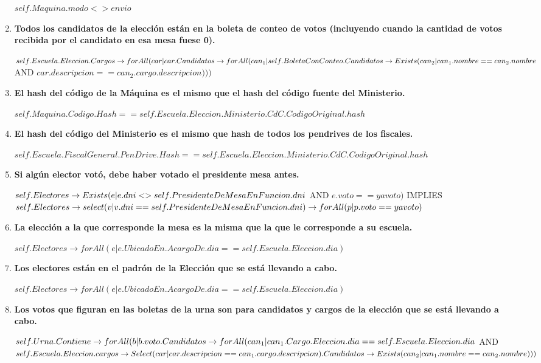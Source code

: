 \begin{enumerate}
$self.Maquina.modo <> envio$

\item \textbf{Todos los candidatos de la elecci\'on est\'an en la boleta de conteo de votos (incluyendo cuando la cantidad de votos recibida por el candidato en esa mesa fuese 0).}

$self.Escuela.Eleccion.Cargos \rightarrow \\
forAll(car | car.Candidatos \rightarrow \\
forAll(can_1 | self.BoletaConConteo.Candidatos \rightarrow \\
Exists(can_2| can_1.nombre == can_2.nombre $ AND $car.descripcion==can_2.cargo.descripcion)))$

\item \textbf{El hash del código de la M\'aquina es el mismo que el hash del código fuente del Ministerio. }

$self.Maquina.Codigo.Hash == self.Escuela.Eleccion.Ministerio.CdC.CodigoOriginal.hash$

\item \textbf{El hash del código del Ministerio es el mismo que hash de todos los pendrives de los fiscales.}

$self.Escuela.FiscalGeneral.PenDrive.Hash == self.Escuela.Eleccion.Ministerio.CdC.CodigoOriginal.hash$

\item \textbf{Si alg\'un elector vot\'o, debe haber votado el presidente mesa antes.}

$self.Electores \rightarrow \\
Exists (e | e.dni <> self.PresidenteDeMesaEnFuncion.dni $ AND $e.voto==yavoto)$ IMPLIES $\\
self.Electores \rightarrow select(v | v.dni==self.PresidenteDeMesaEnFuncion.dni) \rightarrow \\
forAll(p | p.voto==yavoto)$

\item \textbf{La elecci\'on a la que corresponde la mesa es la misma que la que le corresponde a su escuela.}

$self.Electores \rightarrow forAll (e | e.UbicadoEn.AcargoDe.dia == self.Escuela.Eleccion.dia)$

\item \textbf{Los electores est\'an en el padr\'on de la Elecci\'on que se est\'a llevando a cabo.}

$self.Electores \rightarrow forAll(e | e.UbicadoEn.AcargoDe.dia == self.Escuela.Eleccion.dia)$

\item \textbf{Los votos que figuran en las boletas de la urna son para candidatos y cargos de la elecci\'on que se est\'a llevando a cabo.}

$self.Urna.Contiene \rightarrow forAll(b | \\
b.voto.Candidatos \rightarrow forAll(can_1 | can_1.Cargo.Eleccion.dia  == self.Escuela.Eleccion.dia \\
$ AND $ \\
self.Escuela.Eleccion.cargos \rightarrow Select (car | car.descripcion == can_1.cargo.descripcion).Candidatos \rightarrow Exists(can_2 | can_1.nombre == can_2.nombre)))$
\end{enumerate}

